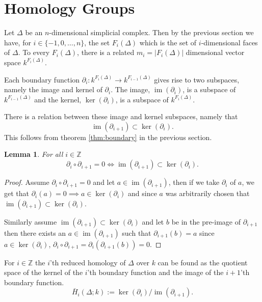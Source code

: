 \documentclass[11pt,a4paper,twoside]{report}
\newtheorem{mylem}[mythm]{Lemma}
\DeclareMathOperator{\im}{im}
\begin{document}
\section{Homology Groups}
Let $\Delta$ be an $n$-dimensional simplicial complex. Then by the previous section we have, for $i\in\{-1,0,\dots,n\}$, the set $F_i(\Delta)$ which is the set of $i$-dimensional faces of $\Delta$. To every $F_i(\Delta)$, there is a related $m_i = |F_i(\Delta)|$ dimensional vector space $k^{F_i(\Delta)}$.

Each boundary function $\partial_i:k^{F_i(\Delta)}\to k^{F_{i-1}(\Delta)}$ gives rise to two subspaces, namely the image and kernel of $\partial_i$. The image, $\im(\partial_i)$, is a subspace of $k^{F_{i-1}(\Delta)}$ and the kernel, $\ker(\partial_i)$, is a subspace of $k^{F_{i}(\Delta)}$. 

There is a relation between these image and kernel subspaces, namely that 
\begin{equation*}
\im(\partial_{i+1})\subset\ker(\partial_i).
\end{equation*}
This follows from theorem \ref{thm:boundary} in the previous section.
\begin{mylem}\label{lem:subset}
For all $i\in\mathbb{Z}$ 
\begin{equation*}
\partial_i\circ\partial_{i+1}=0 \Leftrightarrow \im(\partial_{i+1})\subset\ker(\partial_i).
\end{equation*}
\end{mylem}
\begin{proof}
Assume $\partial_i\circ\partial_{i+1}=0$ and let $a\in \im(\partial_{i+1})$, then if we take $\partial_i$ of $a$, we get that $\partial_i(a)=0\implies a\in \ker(\partial_i)$ and since $a$ was arbitrarily chosen that $\im(\partial_{i+1})\subset \ker(\partial_i)$. 

Similarly assume $\im(\partial_{i+1})\subset \ker(\partial_i)$ and let $b$ be in the pre-image of $\partial_{i+1}$ then there exists an $a\in\im(\partial_{i+1})$ such that 
$\partial_{i+1}(b)=a$ since $a\in\ker(\partial_i)$, $\partial_i\circ\partial_{i+1}=\partial_i(\partial_{i+1}(b))=0$. 
\end{proof}


For $i\in\mathbb{Z}$ the $i$'th reduced homology of $\Delta$ over $k$ can be found as the quotient space of the kernel of the $i$'th boundary function and the image of the $i+1$'th boundary function. \cite[p.2]{Allgaier}
\begin{equation}
\bar{H}_i(\Delta;k):=\ker(\partial_i)/\im(\partial_{i+1}).
\end{equation}
\end{document}
